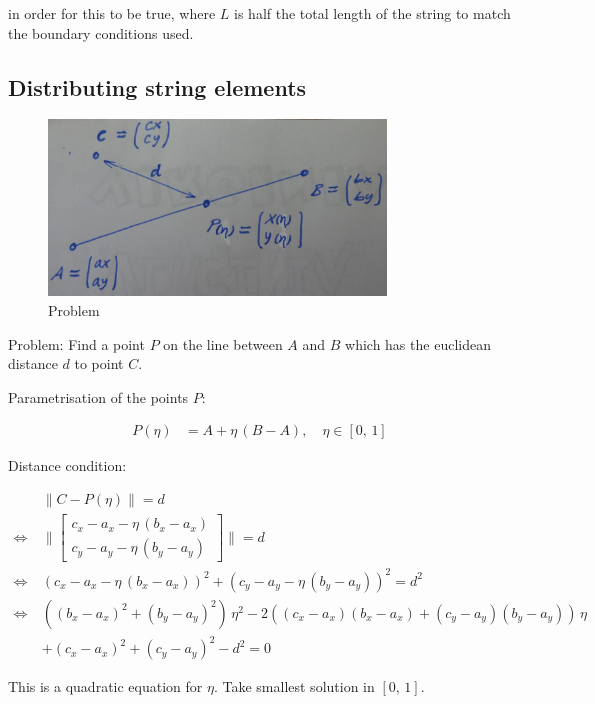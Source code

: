 in order for this to be true, where $L$ is half the total length of the string to match the boundary conditions used.

\subsection{Distributing string elements}

\begin{figure}[h]
\centering
\includegraphics[width=0.8\textwidth]{figures/setup/line-distance}
\caption{Problem}
\label{fig:solution:dynamic_progress}
\end{figure}

Problem: Find a point $P$ on the line between $A$ and $B$ which has the euclidean distance $d$ to point $C$.

Parametrisation of the points $P$:

\begin{align*}
P(\eta) &= A + \eta\,(B-A),\quad \eta \in [0,\,1]
\end{align*}

Distance condition:

\begin{align*}
&\lVert C - P(\eta)\rVert = d\\
\Leftrightarrow\:&\lVert
\begin{bmatrix}
c_x - a_x - \eta\,(b_x - a_x) \\ c_y - a_y - \eta\,(b_y - a_y)
\end{bmatrix}
\rVert = d\\
\Leftrightarrow\:&\left(c_x - a_x - \eta\,(b_x - a_x)\right)^2 + \left(c_y - a_y - \eta\,(b_y - a_y)\right)^2 = d^2\\
\Leftrightarrow\:&\left((b_x - a_x)^2 + (b_y - a_y)^2\right)\,\eta^2-2\left((c_x - a_x)(b_x - a_x) + (c_y - a_y)(b_y - a_y)\right)\,\eta\\
&+(c_x - a_x)^2 + (c_y - a_y)^2 - d^2 = 0
\end{align*}

This is a quadratic equation for $\eta$. Take smallest solution in $[0,\,1]$.
